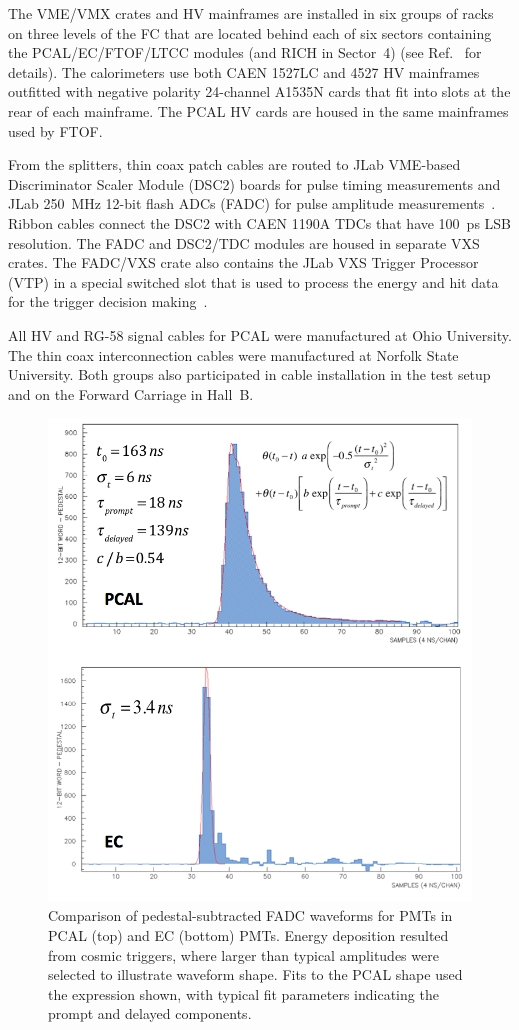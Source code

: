 The VME/VMX crates and HV mainframes are installed in six groups of racks on three levels of the FC that are located
behind each of six sectors containing the PCAL/EC/FTOF/LTCC modules (and RICH in Sector~4) (see
Ref.~\cite{nim:overview} for details). The calorimeters use both CAEN 1527LC and 4527 HV mainframes outfitted
with negative polarity 24-channel A1535N cards that fit into slots at the rear of each mainframe. The PCAL HV
cards are housed in the same mainframes used by FTOF.  

From the splitters, thin coax patch cables are routed to JLab VME-based Discriminator Scaler Module (DSC2) boards for pulse timing measurements and JLab 250~MHz 12-bit flash ADCs (FADC) for pulse amplitude measurements~\cite{nim:daq}. Ribbon cables
connect the DSC2 with CAEN 1190A TDCs that have 100~ps LSB resolution. The FADC and DSC2/TDC modules
are housed in separate VXS crates. The FADC/VXS crate also contains the JLab VXS Trigger Processor (VTP) in a
special switched slot that is used to process the energy and hit data for the trigger decision making~\cite{nim:daq,nim:trig}.  

All HV and RG-58 signal cables for PCAL were manufactured at Ohio University. The thin coax interconnection
cables were  manufactured at Norfolk State University. Both groups also participated in cable installation
in the test setup and on the Forward Carriage in Hall~B.  

\begin{figure}[hbt]
\centering
\includegraphics[width=0.95\columnwidth,keepaspectratio]{img/S5_3.png}
\caption{Comparison of pedestal-subtracted FADC waveforms for PMTs in PCAL (top) and EC (bottom) PMTs.
  Energy deposition resulted from cosmic triggers, where larger than typical amplitudes were selected to
  illustrate waveform shape. Fits to the PCAL shape used the expression shown, with typical fit parameters
  indicating the prompt and delayed components.}
\label{fig:S5_3}
\end{figure}

